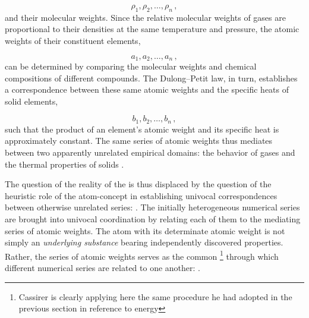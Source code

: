 \documentclass[submitted,12pt]{article}
\begin{document}

\begin{equation*}
\rho_1, \rho_2, \ldots, \rho_n\,,
\end{equation*}
%
and their molecular weights. Since the relative molecular weights of gases are proportional to their densities at the same temperature and pressure, the atomic weights of their constituent elements,

\begin{equation*}
a_1, a_2, \ldots, a_n\,,
\end{equation*}
%
can be determined by comparing the molecular weights and chemical compositions of different compounds. The Dulong--Petit law, in turn, establishes a correspondence between these same atomic weights and the specific heats of solid elements,

\begin{equation*}
b_1, b_2, \ldots, b_n\,,
\end{equation*}
%
such that the product of an element's atomic weight and its specific heat is approximately constant. The same series of atomic weights thus mediates between two apparently unrelated empirical domains: the behavior of gases and the thermal properties of solids .

The question of the reality of the  is thus displaced by the question of the heuristic role of the atom-concept in establishing univocal correspondences between otherwise unrelated series:  . The initially heterogeneous numerical series are brought into univocal coordination  by relating each of them to the mediating series of atomic weights. The atom with its determinate atomic weight is not simply an \emph{underlying substance} bearing independently discovered properties. Rather, the series of atomic weights serves as the common  \footnote{Cassirer is clearly applying here the same procedure he had adopted in the previous section  in reference to energy} through which different numerical series are related to one another:  .
\end{document}
